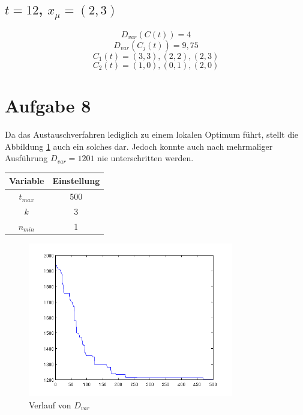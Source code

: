 \subsection*{$t = 12$, $x_{\mu} = (2,3)$}
\[D_{var}(C(t)) = 4\]
\[D_{var}(C_{j}(t)) = 9,75\]
\[C_{1}(t) = {(3,3),(2,2),(2,3)}\]
\[C_{2}(t) = {(1,0),(0,1),(2,0)}\]



\FloatBarrier
\newpage
\section*{Aufgabe 8}
Da das Austauschverfahren lediglich zu einem lokalen Optimum führt, stellt die Abbildung \ref{fig:aufg8} auch ein solches dar. Jedoch konnte auch nach mehrmaliger Ausführung $D_{var} = 1201$ nie unterschritten werden. 
\begin{table}[htb]
  \centering
  \begin{tabular}{c|c}
    \textbf{Variable} & \textbf{Einstellung}\\
    \hline
    $t_{max}$ & 500\\
    $k$ & 3\\
    $n_{min}$ & 1\\
  \end{tabular}
\end{table}
\begin{figure}[h]
	\centering
	\includegraphics[width=0.8\textwidth]{../80X-Plot.png}
	\caption{Verlauf von $D_{var}$}
	\label{fig:aufg8}
\end{figure}

